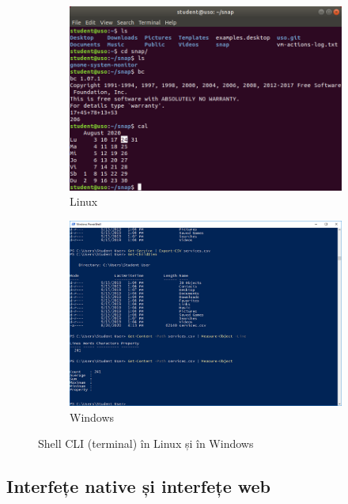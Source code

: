 \begin{figure}[!htbp]
  \centering
  \begin{subfigure}[b]{0.6\textwidth}
    \includegraphics[width=\textwidth]{chapters/01-ui/img/linux-terminal.png}
    \caption{Linux}
    \label{fig:ui:shell-cli:linux}
  \end{subfigure}

  \begin{subfigure}[b]{0.6\textwidth}
    \includegraphics[width=\textwidth]{chapters/01-ui/img/powershell.png}
    \caption{Windows}
    \label{fig:ui:shell-cli:windows}
  \end{subfigure}

  \caption{Shell CLI (terminal) în Linux și în Windows}
  \label{fig:ui:shell-cli-linux-windows}
\end{figure}

\subsection{Interfețe native și interfețe web}
\label{sec:ui:native-web}

